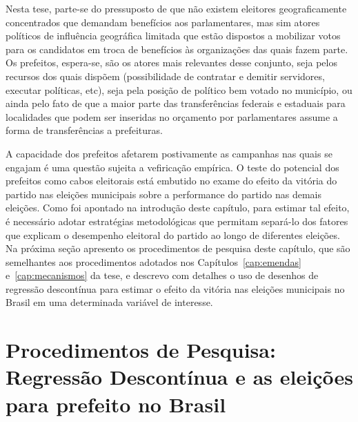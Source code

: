 Nesta tese, parte-se do pressuposto de que não existem eleitores geograficamente concentrados que demandam benefícios aos parlamentares, mas sim atores políticos de influência geográfica limitada que estão dispostos a mobilizar votos para os candidatos em troca de benefícios às organizações das quais fazem parte. Os prefeitos, espera-se, são os atores mais relevantes desse conjunto, seja pelos recursos dos quais dispõem (possibilidade de contratar e demitir servidores, executar políticas, etc), seja pela posição de político bem votado no município, ou ainda pelo fato de que a maior parte das transferências federais e estaduais para localidades que podem ser inseridas no orçamento por parlamentares assume a forma de transferências a prefeituras.

A capacidade dos prefeitos afetarem postivamente as campanhas nas quais se engajam é uma questão sujeita a vefiricação empírica. O teste do potencial dos prefeitos como cabos eleitorais está embutido no exame do efeito da vitória do partido nas eleições municipais sobre a performance do partido nas demais eleições. Como foi apontado na introdução deste capítulo, para estimar tal efeito, é necessário adotar estratégias metodológicas que permitam separá-lo dos fatores que explicam o desempenho eleitoral do partido ao longo de diferentes eleições. Na próxima seção apresento os procedimentos de pesquisa deste capítulo, que são semelhantes aos procedimentos adotados nos Capítulos~\ref{cap:emendas} e~\ref{cap:mecanismos} da tese, e descrevo com detalhes o uso de desenhos de regressão descontínua para estimar o efeito da vitória nas eleições municipais no Brasil em uma determinada variável de interesse.

\section{Procedimentos de Pesquisa: Regressão Descontínua e as eleições para prefeito no Brasil}

